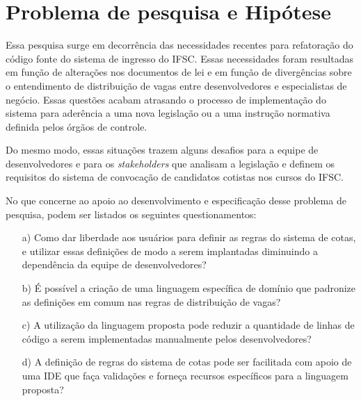 \section{Problema de pesquisa e Hipótese}
\label{problema}

Essa pesquisa surge em decorrência das necessidades recentes para refatoração do código fonte do sistema de ingresso do \gls{IFSC}. Essas necessidades foram resultadas em função de alterações nos documentos de lei e em função de  divergências sobre o entendimento de distribuição de vagas entre desenvolvedores e especialistas de negócio. Essas questões acabam atrasando o processo de implementação do sistema para aderência a uma nova legislação ou a uma instrução normativa definida pelos órgãos de controle.

Do mesmo modo, essas situações trazem alguns desafios para a equipe de desenvolvedores e para os \textit{stakeholders} que analisam a legislação e definem os requisitos do sistema de convocação de candidatos cotistas nos cursos do \gls{IFSC}. 

No que concerne ao apoio ao desenvolvimento e especificação desse problema de pesquisa, podem ser listados os seguintes questionamentos:

\begin{enumerate}
    \item[a)] Como dar liberdade aos usuários para definir as regras do sistema de cotas, e utilizar essas definições de modo a serem implantadas diminuindo a dependência da equipe de  desenvolvedores?
    
    \item[b)] É possível a criação de uma linguagem específica de domínio que padronize as definições em comum nas regras de distribuição de vagas?
    
    \item[c)] A utilização da linguagem proposta pode reduzir a quantidade de linhas de código a serem implementadas manualmente pelos desenvolvedores?
    
    \item[d)] A definição de regras do sistema de cotas pode ser facilitada com apoio de uma \gls{IDE} que faça validações e forneça recursos específicos para a linguagem proposta?
    

    
\end{enumerate}